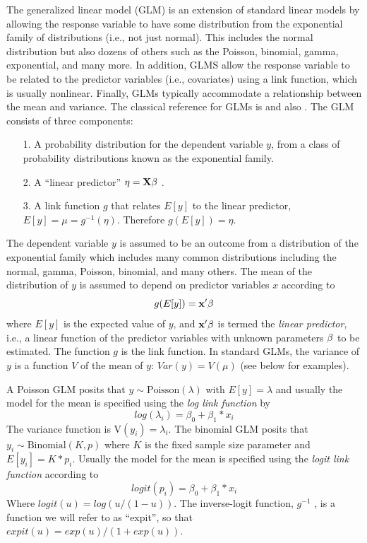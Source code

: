 The generalized linear model (GLM) is an extension of standard linear
models by allowing the response
variable to have some distribution from the exponential family of
distributions (i.e., not just normal). This includes the normal
distribution but also dozens of others such as the Poisson, binomial,
gamma, exponential, and many more. In addition, GLMS allow the
response variable to be related to the predictor variables (i.e.,
covariates) using a
link function, which is usually nonlinear.  Finally, GLMs typically
accommodate a relationship between the mean and variance. The
classical reference for GLMs is \citet{nelder_wedderburn:1972} and
also \citet{mccullagh_nelder:1989}.
The GLM consists of three components:
\begin{itemize}
\item[1.] A probability distribution for the dependent variable $y$,
from a class of probability distributions known as the exponential family.
\item[2.] A ``linear predictor'' $\eta = {\bf X}{\bold \beta}$  .
\item[3.] A link function $g$ that relates $E[y]$ to the linear predictor, $E[y] = \mu = g^{-1}(\eta)$. Therefore $g(E[y]) = \eta$.
\end{itemize}

The dependent variable $y$ is assumed to be an outcome from a
distribution of the exponential family which includes many common
distributions including the normal, gamma, Poisson, binomial, and many
others. The mean of the distribution of $y$ is assumed to depend on predictor variables $x$ according to
\[
 g(E[y]) = {\bf x}'{\bold \beta}
\]
where $E[y]$ is the expected value of $y$, and ${\bf x}'{\bold \beta}$
is termed the {\it linear predictor}, i.e., a linear function of the
predictor variables with unknown parameters ${\bold \beta}$ to be
estimated.  The function $g$ is the link function. In standard GLMs,
the variance of $y$ is a function $V$ of the mean of $y$: $Var(y) =
V(\mu)$ (see below for examples).

A Poisson GLM posits that $y \sim \mbox{Poisson}(\lambda)$ with $E[y]
=\lambda$ and usually the model for the mean is specified using the
{\it log link function} by
\[
log(\lambda_{i}) = \beta_0 + \beta_{1}*x_{i}
\]
The variance function is $\mbox{V}(y_{i}) = \lambda_{i}$.  The
binomial GLM posits that $y_{i} \sim \mbox{Binomial}(K,p)$ where $K$
is the fixed sample size parameter and $E[y_{i}] = K*p_{i}$. Usually
the model for the mean is specified using the {\it logit link
  function} according to
\[
 logit(p_{i}) = \beta_{0} + \beta_{1}*x_{i}
\]
Where $logit(u) = log(u/(1-u))$.  The inverse-logit function, $g^{-1}$ ,
is a function we will refer to as ``expit'', so that $expit(u) =
exp(u)/(1+exp(u))$.

